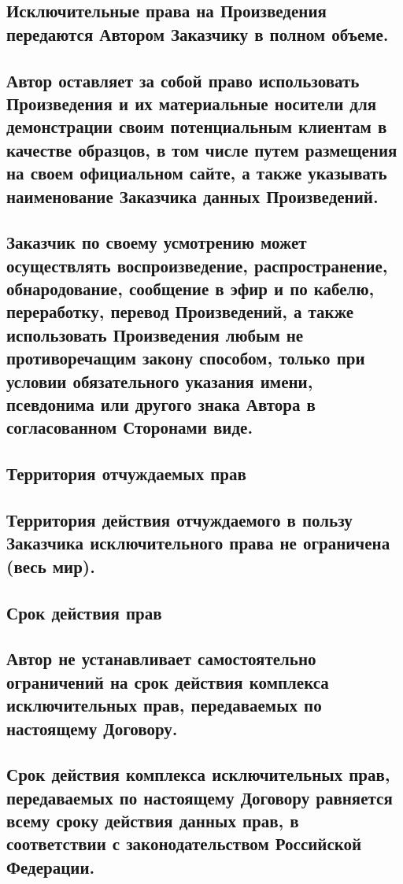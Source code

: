 \documentclass[12pt]{article}
\begin{document}
\subsection{Исключительные права на Произведения передаются Автором Заказчику в полном объеме.}

\subsection{Автор оставляет за собой право использовать Произведения и их материальные носители для демонстрации своим потенциальным клиентам в качестве образцов, в том числе путем размещения на своем официальном сайте, а также указывать наименование Заказчика данных Произведений.}

\subsection{Заказчик по своему усмотрению может осуществлять воспроизведение, распространение, обнародование, сообщение в эфир и по кабелю, переработку, перевод Произведений, а также использовать Произведения любым не противоречащим закону способом, только при условии обязательного указания имени, псевдонима или другого знака Автора в согласованном Сторонами виде.}

\subsection*{\bf Территория отчуждаемых прав}

\subsection{Территория действия отчуждаемого в пользу Заказчика исключительного права не ограничена (весь мир).}

\subsection*{\bf Срок действия прав}

\subsection{Автор не устанавливает самостоятельно ограничений на срок действия комплекса исключительных прав, передаваемых по настоящему Договору.}

\subsection{Срок действия комплекса исключительных прав, передаваемых по настоящему Договору равняется всему сроку действия данных прав, в соответствии с законодательством Российской Федерации.}
\end{document}
